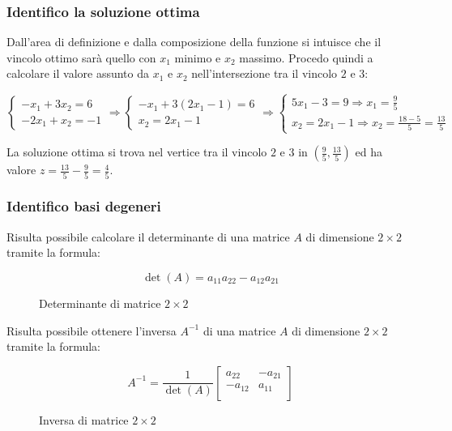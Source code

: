 \documentclass[\main/main.tex]{subfiles}
\begin{document}
\subsubsection*{Identifico la soluzione ottima}
Dall'area di definizione e dalla composizione della funzione si intuisce che il vincolo ottimo sarà quello con $x_1$ minimo e $x_2$ massimo. Procedo quindi a calcolare il valore assunto da $x_1$ e $x_2$ nell'intersezione tra il vincolo $2$ e $3$:

\[
  \begin{cases}
    -x_1 + 3x_2  = 6 \\
    -2x_1 + x_2  = -1
  \end{cases}
  \Rightarrow
  \begin{cases}
    -x_1 + 3(2x_1 -1)  = 6 \\
    x_2  =2x_1 -1
  \end{cases}
  \Rightarrow
  \begin{cases}
    5x_1 -3  = 9 \Rightarrow x_1 = \frac{9}{5} \\
    x_2  =2x_1 -1 \Rightarrow x_2 = \frac{18-5}{5} = \frac{13}{5}
  \end{cases}
\]

La soluzione ottima si trova nel vertice tra il vincolo $2$ e $3$ in $(\frac{9}{5}, \frac{13}{5})$ ed ha valore $z = \frac{13}{5} - \frac{9}{5} = \frac{4}{5}$.

\subsubsection*{Identifico basi degeneri}
\begin{definition}
  Risulta possibile calcolare il determinante di una matrice $A$ di dimensione $2 \times 2$ tramite la formula:
  \begin{figure}
    \[
      \det(A) = a_{11}a_{22} - a_{12}a_{21}
    \]
    \caption{Determinante di matrice $2 \times 2$}
  \end{figure}
\end{definition}

\begin{definition}
  Risulta possibile ottenere l'inversa $A^{-1}$ di una matrice $A$ di dimensione $2 \times 2$ tramite la formula:
  \begin{figure}
    \[
      A^{-1} = \frac{1}{\det(A)} \begin{bmatrix}
        a_{22}  & -a_{21} \\
        -a_{12} & a_{11}  \\
      \end{bmatrix}
    \]
    \caption{Inversa di matrice $2 \times 2$}
  \end{figure}
\end{definition}
\end{document}
